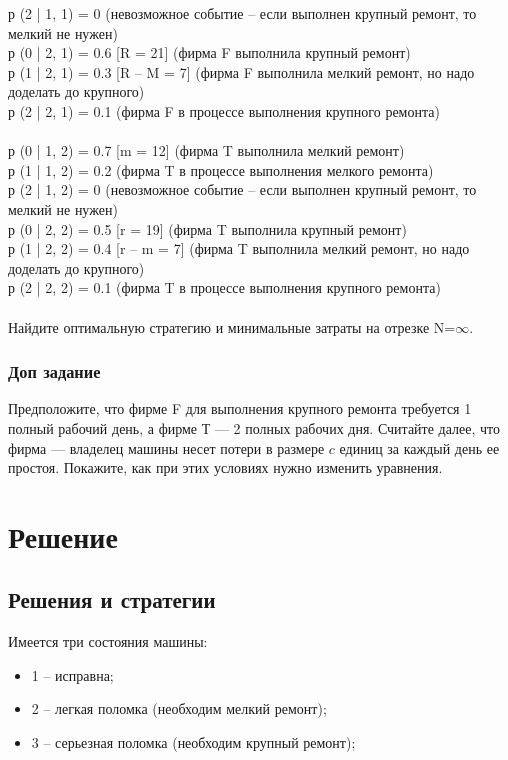 р (2 | 1, 1) = 0 (невозможное событие -- если выполнен крупный ремонт, то мелкий не нужен)\\
р (0 | 2, 1) = 0.6 [R = 21] (фирма F выполнила крупный ремонт)\\
р (1 | 2, 1) = 0.3 [R – M = 7] (фирма F выполнила мелкий ремонт, но надо доделать до крупного)\\
р (2 | 2, 1) = 0.1 (фирма F в процессе выполнения крупного ремонта)\\\\
р (0 | 1, 2) = 0.7 [m = 12] (фирма T выполнила мелкий ремонт)\\
р (1 | 1, 2) = 0.2 (фирма T в процессе выполнения мелкого ремонта)\\
р (2 | 1, 2) = 0 (невозможное событие -- если выполнен крупный ремонт, то мелкий не нужен)\\
р (0 | 2, 2) = 0.5 [r = 19] (фирма T выполнила крупный ремонт)\\
р (1 | 2, 2) = 0.4 [r – m = 7] (фирма T выполнила мелкий ремонт, но надо доделать до крупного)\\
р (2 | 2, 2) = 0.1 (фирма T в процессе выполнения крупного ремонта)\\
\\
Найдите оптимальную стратегию и минимальные затраты на отрезке N=$\infty$.

\subsubsection{Доп задание}

Предположите, что фирме F для выполнения крупного ремонта требуется 1 полный рабочий день, а фирме Т — 2 полных рабочих
дня. Считайте далее, что фирма — владелец машины несет потери в размере $c$ единиц за каждый день ее простоя. Покажите, как при этих условиях нужно изменить уравнения.

\section{Решение}

\subsection{Решения и стратегии}

Имеется три состояния машины:

\begin{itemize}
	\item 1 -- исправна;
	\item 2 -- легкая поломка (необходим мелкий ремонт);
	\item 3 -- серьезная поломка (необходим крупный ремонт);
\end{itemize}

